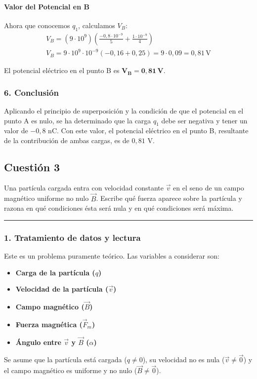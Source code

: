 \paragraph*{Valor del Potencial en B}
Ahora que conocemos $q_1$, calculamos $V_B$:
\begin{gather}
    V_B = (9 \cdot 10^9) \left( \frac{-0,8 \cdot 10^{-9}}{5} + \frac{1 \cdot 10^{-9}}{4} \right) \nonumber \\[8pt]
    V_B = 9 \cdot 10^9 \cdot 10^{-9} \left( -0,16 + 0,25 \right) = 9 \cdot 0,09 = 0,81 \, \text{V}
\end{gather}
\begin{cajaresultado}
El potencial eléctrico en el punto B es $\boldsymbol{V_B = 0,81 \, V}$.
\end{cajaresultado}

\subsubsection*{6. Conclusión}
\begin{cajaconclusion}
Aplicando el principio de superposición y la condición de que el potencial en el punto A es nulo, se ha determinado que la carga $q_1$ debe ser negativa y tener un valor de $-0,8$ nC. Con este valor, el potencial eléctrico en el punto B, resultante de la contribución de ambas cargas, es de $0,81$ V.
\end{cajaconclusion}

\newpage

\subsection{Cuestión 3}
\label{subsec:C3_2022_jun_ord}

\begin{cajaenunciado}
Una partícula cargada entra con velocidad constante $\vec{v}$ en el seno de un campo magnético uniforme no nulo $\vec{B}$. Escribe qué fuerza aparece sobre la partícula y razona en qué condiciones ésta será nula y en qué condiciones será máxima. 
\end{cajaenunciado}
\hrule

\subsubsection*{1. Tratamiento de datos y lectura}
Este es un problema puramente teórico. Las variables a considerar son:
\begin{itemize}
    \item \textbf{Carga de la partícula ($q$)}
    \item \textbf{Velocidad de la partícula ($\vec{v}$)}
    \item \textbf{Campo magnético ($\vec{B}$)}
    \item \textbf{Fuerza magnética ($\vec{F}_m$)}
    \item \textbf{Ángulo entre $\vec{v}$ y $\vec{B}$ ($\alpha$)}
\end{itemize}
Se asume que la partícula está cargada ($q \neq 0$), su velocidad no es nula ($\vec{v} \neq \vec{0}$) y el campo magnético es uniforme y no nulo ($\vec{B} \neq \vec{0}$).

